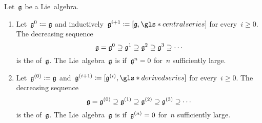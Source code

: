 \begin{definition}
  Let~$\mathfrak{g}$ be a Lie~algebra.
  \begin{enumerate}
    \item
      Let~$\mathfrak{g}^0 \coloneqq \mathfrak{g}$ and inductively~$\glie^{i+1} \defined [\glie, \gls*{central series}]$ for every~$i \geq 0$.
      The decreasing sequence
      \[
        \mathfrak{g}
        =
        \mathfrak{g}^0
        \supseteq
        \mathfrak{g}^1
        \supseteq
        \mathfrak{g}^2
        \supseteq
        \mathfrak{g}^3
        \supseteq
        \dotsb
      \]
      is the  of~$\mathfrak{g}$.
      The Lie~algebra~$\mathfrak{g}$ is  if~$\mathfrak{g}^n = 0$ for~$n$ sufficiently large.
    \item
      Let~$\mathfrak{g}^{(0)} \coloneqq \mathfrak{g}$ and~$\glie^{(i+1)} \defined [\glie^{(i)}, \gls*{derived series}]$ for every~$i \geq 0$.
      The decreasing sequence
      \[
        \mathfrak{g}
        =
        \mathfrak{g}^{(0)}
        \supseteq
        \mathfrak{g}^{(1)}
        \supseteq
        \mathfrak{g}^{(2)}
        \supseteq
        \mathfrak{g}^{(3)}
        \supseteq
        \dotsb
      \]
      is the  of~$\mathfrak{g}$.
      The Lie~algebra~$\mathfrak{g}$ is  if~$\mathfrak{g}^{(n)} = 0$ for~$n$ sufficiently large.
  \end{enumerate}
\end{definition}


